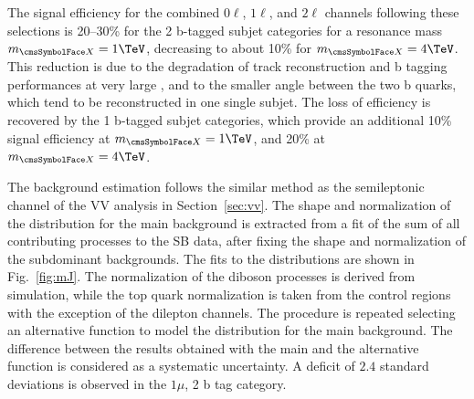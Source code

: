The signal efficiency for the combined $0\ell$, $1\ell$, and $2\ell$ channels following these selections is 20--30\% for the 2 b-tagged 
subjet categories for a resonance mass $\mX = 1\TeV$, decreasing to about 10\% for $\mX = 4\TeV$. This reduction is due to the degradation 
of track reconstruction and b tagging performances at very large \pt, and to the smaller angle between the two b quarks, which tend to be 
reconstructed in one single subjet. The loss of efficiency is recovered by the 1 b-tagged subjet categories, which provide an additional 
10\% signal efficiency at $\mX = 1\TeV$, and 20\% at $\mX = 4\TeV$.

The background estimation follows the similar method as the semileptonic channel of the VV analysis in Section~\ref{sec:vv}.
The shape and normalization of the \mj distribution for the main \Vjets background is extracted from a fit of the sum of all contributing 
processes to the SB data, after fixing the shape and normalization of the subdominant backgrounds. The fits to the \mj distributions are 
shown in Fig.~\ref{fig:mJ}.
The normalization of the diboson processes is derived from simulation, while the top quark normalization is taken from the control regions 
with the exception of the dilepton channels.
The procedure is repeated selecting an alternative function to model the \mj distribution for the main background. The difference between 
the results obtained with the main and the alternative function is considered as a systematic uncertainty.
A deficit of $2.4$ standard deviations is observed in the $1\mu$, 2 b tag category.


